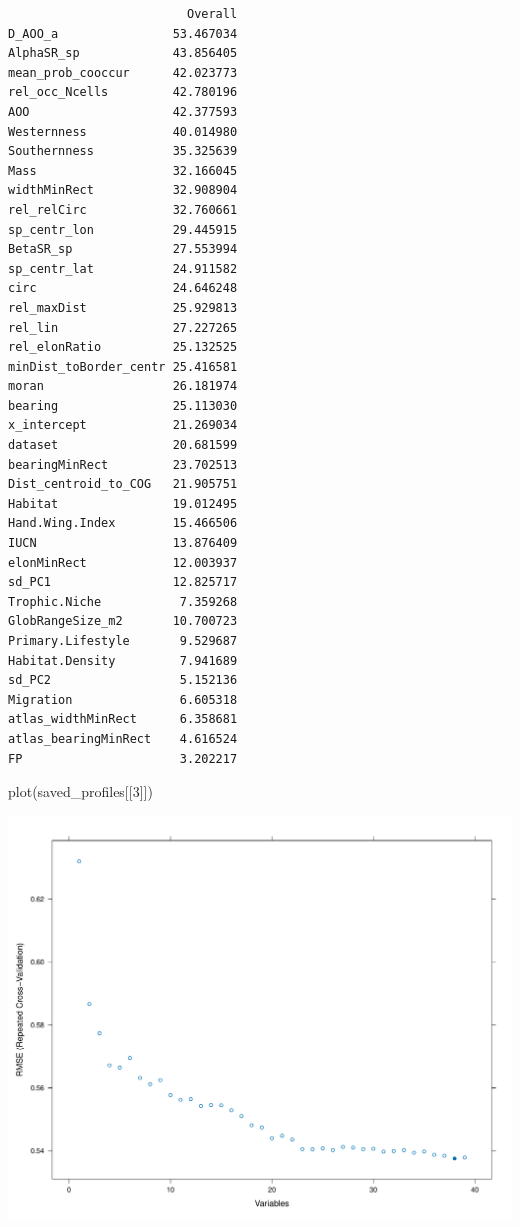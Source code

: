\documentclass[
  letterpaper,
  DIV=11,
  numbers=noendperiod]{scrreprt}
\newenvironment{Shaded}{\begin{snugshade}}{\end{snugshade}}
\newcommand{\DecValTok}[1]{\textcolor[rgb]{0.68,0.00,0.00}{#1}}
\newcommand{\FunctionTok}[1]{\textcolor[rgb]{0.28,0.35,0.67}{#1}}
\newcommand{\NormalTok}[1]{\textcolor[rgb]{0.00,0.23,0.31}{#1}}
\newcommand{\SpecialCharTok}[1]{\textcolor[rgb]{0.37,0.37,0.37}{#1}}
\begin{document}
\begin{Shaded}
\end{Shaded}

\begin{verbatim}
                         Overall
D_AOO_a                53.467034
AlphaSR_sp             43.856405
mean_prob_cooccur      42.023773
rel_occ_Ncells         42.780196
AOO                    42.377593
Westernness            40.014980
Southernness           35.325639
Mass                   32.166045
widthMinRect           32.908904
rel_relCirc            32.760661
sp_centr_lon           29.445915
BetaSR_sp              27.553994
sp_centr_lat           24.911582
circ                   24.646248
rel_maxDist            25.929813
rel_lin                27.227265
rel_elonRatio          25.132525
minDist_toBorder_centr 25.416581
moran                  26.181974
bearing                25.113030
x_intercept            21.269034
dataset                20.681599
bearingMinRect         23.702513
Dist_centroid_to_COG   21.905751
Habitat                19.012495
Hand.Wing.Index        15.466506
IUCN                   13.876409
elonMinRect            12.003937
sd_PC1                 12.825717
Trophic.Niche           7.359268
GlobRangeSize_m2       10.700723
Primary.Lifestyle       9.529687
Habitat.Density         7.941689
sd_PC2                  5.152136
Migration               6.605318
atlas_widthMinRect      6.358681
atlas_bearingMinRect    4.616524
FP                      3.202217
\end{verbatim}

\begin{Shaded}
\begin{Highlighting}[]
\FunctionTok{plot}\NormalTok{(saved\_profiles[[}\DecValTok{3}\NormalTok{]])}
\end{Highlighting}
\end{Shaded}

\includegraphics{02_rfe_files/figure-pdf/rfe-results-boxplot-lr-1.pdf}
\end{document}
